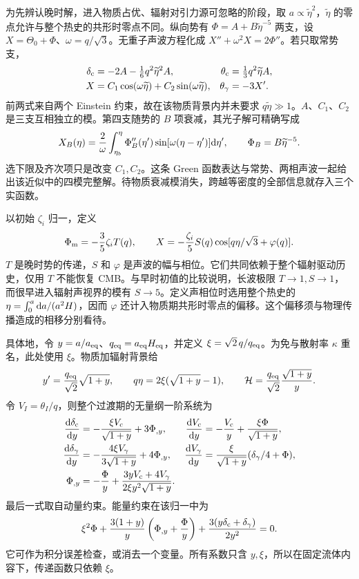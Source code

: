 为先辨认晚时解，进入物质占优、辐射对引力源可忽略的阶段，取 $a\propto\widetilde\eta^2$，$\widetilde\eta$ 的零点允许与整个热史的共形时零点不同。纵向势有 $\Phi=A+B\widetilde\eta^{-5}$ 两支，设 $X=\Theta_0+\Phi$、$\omega=q/\sqrt3$。无重子声波方程化成 $X''+\omega^2X=2\Phi''$。若只取常势支，
\[
 \begin{aligned}
 \delta_{\rm c}&=-2A-\tfrac16q^2\widetilde\eta^2A,&
 \theta_{\rm c}&=\tfrac13q^2\widetilde\eta A,\\
 X&=C_1\cos(\omega\widetilde\eta)+C_2\sin(\omega\widetilde\eta),&
 \theta_\gamma&=-3X'.
 \end{aligned}
\]
前两式来自两个 Einstein 约束，故在该物质背景内并未要求 $q\widetilde\eta\gg1$。$A$、$C_1$、$C_2$ 是三支互相独立的模。第四支随势的 $B$ 项衰减，其光子解可精确写成
\[
 X_B(\eta)=\frac{2}{\omega}\int_{\eta_b}^{\eta}
        \Phi_B''(\eta')\sin[\omega(\eta-\eta')]\dd\eta' ,
 \qquad \Phi_B=B\widetilde\eta^{-5}.
\]
选下限及齐次项只是改变 $C_1,C_2$。这条 Green 函数表达与常势、两相声波一起给出该近似中的四模完整解。待物质衰减模消失，跨越等密度的全部信息就存入三个实函数。

以初始 $\zeta_i$ 归一，定义
\[
 \Phi_{\rm m}=-\frac35\zeta_i T(q),\qquad
 X=-\frac{\zeta_i}{5}S(q)
                    \cos[q\eta/\sqrt3+\varphi(q)] .
\]
$T$ 是晚时势的传递，$S$ 和 $\varphi$ 是声波的幅与相位。它们共同依赖于整个辐射驱动历史，仅用 $T$ 不能恢复 CMB。与早时初值的比较说明，长波极限 $T\to1,S\to1$，而很早进入辐射声视界的模有 $S\to5$。定义声相位时选用整个热史的 $\eta=\int_0^a\dd a/(a^2H)$，因而 $\varphi$ 还计入物质期共形时零点的偏移。这个偏移须与物理传播造成的相移分别看待。

具体地，令 $y=a/a_{\rm eq}$、$q_{\rm eq}=a_{\rm eq}H_{\rm eq}$，并定义 $\xi=\sqrt2\,q/q_{\rm eq}$。为免与散射率 $\kappa$ 重名，此处使用 $\xi$。物质加辐射背景给
\[
 y'=\frac{q_{\rm eq}}{\sqrt2}\sqrt{1+y},\qquad
 q\eta=2\xi(\sqrt{1+y}-1),\qquad
 \mathcal H=\frac{q_{\rm eq}}{\sqrt2}\frac{\sqrt{1+y}}y .
\]
令 $V_I=\theta_I/q$，则整个过渡期的无量纲一阶系统为
\begin{align*}
 \frac{\dd\delta_{\rm c}}{\dd y}
   &=-\frac{\xi V_{\rm c}}{\sqrt{1+y}}+3\Phi_{,y},&
 \frac{\dd V_{\rm c}}{\dd y}
   &=-\frac{V_{\rm c}}y+\frac{\xi\Phi}{\sqrt{1+y}},\\
 \frac{\dd\delta_\gamma}{\dd y}
   &=-\frac{4\xi V_\gamma}{3\sqrt{1+y}}+4\Phi_{,y},&
 \frac{\dd V_\gamma}{\dd y}
   &=\frac{\xi}{\sqrt{1+y}}(\delta_\gamma/4+\Phi),\\
 \Phi_{,y}&=-\frac{\Phi}y+
       \frac{3yV_{\rm c}+4V_\gamma}{2\xi y^2\sqrt{1+y}} .
\end{align*}
最后一式取自动量约束。能量约束在该归一中为
\[
 \xi^2\Phi+\frac{3(1+y)}y\left(\Phi_{,y}+\frac{\Phi}y\right)
            +\frac{3(y\delta_{\rm c}+\delta_\gamma)}{2y^2}=0 .
\]
它可作为积分误差检查，或消去一个变量。所有系数只含 $y,\xi$，所以在固定流体内容下，传递函数只依赖 $\xi$。

